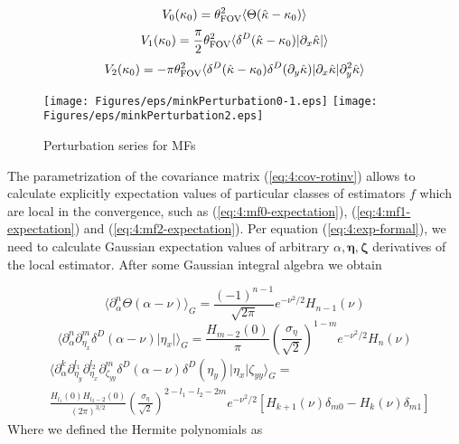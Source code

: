 \begin{equation}
\label{eq:4:mf0-expectation}
V_0(\kappa_0) = \theta_{\rm FOV}^2\langle\Theta(\hat{\kappa}-\kappa_0)\rangle
\end{equation} 
%
\begin{equation}
\label{eq:4:mf1-expectation}
V_1(\kappa_0) = \frac{\pi}{2}\theta_{\rm FOV}^2\langle\delta^D(\hat{\kappa}-\kappa_0)\vert\partial_x\hat{\kappa}\vert\rangle
\end{equation} 
%
\begin{equation}
\label{eq:4:mf2-expectation}
V_2(\kappa_0) = -\pi\theta_{\rm FOV}^2\langle\delta^D(\hat{\kappa}-\kappa_0)\delta^D(\partial_y\hat{\kappa})\vert\partial_x\hat{\kappa}\vert\partial^2_y\hat{\kappa}\rangle
\end{equation}
%
\begin{figure}
\begin{center}
\texttt{[image: Figures/eps/minkPerturbation0-1.eps]}
\texttt{[image: Figures/eps/minkPerturbation2.eps]}
\end{center}
\caption{Perturbation series for MFs}
\label{fig:4:minkpert}
\end{figure}
%
The parametrization of the covariance matrix (\ref{eq:4:cov-rotinv}) allows to calculate explicitly expectation values of particular classes of estimators $f$ which are local in the convergence, such as (\ref{eq:4:mf0-expectation}), (\ref{eq:4:mf1-expectation}) and (\ref{eq:4:mf2-expectation}). Per equation (\ref{eq:4:exp-formal}), we need to calculate Gaussian expectation values of arbitrary $\alpha,\pmb{\eta},\pmb{\zeta}$ derivatives of the local estimator. After some Gaussian integral algebra we obtain

\begin{equation}
\label{eq:4:Rv0}
\langle\partial_\alpha^n\Theta(\alpha-\nu)\rangle_G = \frac{(-1)^{n-1}}{\sqrt{2\pi}}e^{-\nu^2/2}H_{n-1}(\nu) 
\end{equation}
%
\begin{equation}
\label{eq:4:Rv1}
\langle\partial_\alpha^n\partial_{\eta_x}^m\delta^D(\alpha-\nu)\vert\eta_x\vert\rangle_G = \frac{H_{m-2}(0)}{\pi}\left(\frac{\sigma_\eta}{\sqrt{2}}\right)^{1-m}e^{-\nu^2/2}H_n(\nu) 
\end{equation} 
%
\begin{equation}
\label{eq:4:Rv2}
\begin{split}
&\langle\partial_\alpha^k\partial_{\eta_y}^{l_1}\partial_{\eta_x}^{l_2}\partial_{\zeta_{yy}}^m\delta^D(\alpha-\nu)\delta^D(\eta_y)\vert\eta_x\vert\zeta_{yy}\rangle_G = \\ 
&\frac{H_{l_1}(0)H_{l_2-2}(0)}{(2\pi)^{3/2}}\left(\frac{\sigma_\eta}{\sqrt{2}}\right)^{2-l_1-l_2-2m}e^{-\nu^2/2}[H_{k+1}(\nu)\delta_{m0}-H_k(\nu)\delta_{m1}]
\end{split} 
\end{equation} 
%
Where we defined the Hermite polynomials as 

